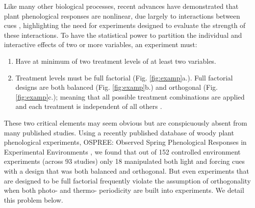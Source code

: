 \documentclass[11pt]{article}
\begin{document}
Like many other biological processes, recent advances have demonstrated that plant phenological responses are nonlinear, due largely to interactions between cues \citep{Wolkovich_2022,fu2015}, highlighting the need for experiments designed to evaluate the strength of these interactions. To have the statistical power to partition the individual and interactive effects of two or more variables, an experiment must:
\begin{enumerate}
\item Have at minimum of two treatment levels of at least two variables.
\item Treatment levels must be full factorial (Fig. \ref{fig:examp}a.). Full factorial designs are both balanced (Fig. \ref{fig:examp}b.)  and orthogonal (Fig. \ref{fig:examp}c.); meaning that all possible treatment combinations are applied and each treatment is independent of all others \citep{cheng2016}.
\end{enumerate}

These two critical elements may seem obvious but are conspicuously absent from many published studies.  Using a recently published database of woody plant phenological experiments, OSPREE: Observed Spring Phenological Responses in Experimental Environments \citep{wolkovich2019}, we found that out of 152 controlled environment experiments (across 93 studies) only 18 manipulated both light and forcing cues with a design that was both balanced and orthogonal. But even experiments that are designed to be full factorial frequently violate the assumption of orthogonality when both photo- and thermo- periodicity are built into experiments. We detail this problem below.
\end{document}
